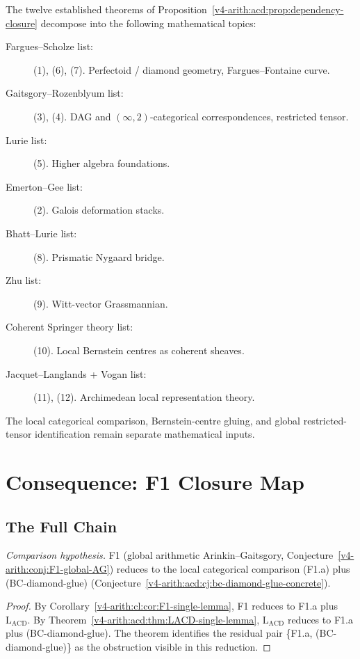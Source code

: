\begin{remark}
\label{v4-arith:acd:rem:source-disjoint-decomposition}
The twelve established theorems of
Proposition~\ref{v4-arith:acd:prop:dependency-closure} decompose into the
following mathematical topics:
\begin{description}
\item[Fargues--Scholze list:] (1), (6), (7). Perfectoid / diamond
geometry, Fargues--Fontaine curve.
\item[Gaitsgory--Rozenblyum list:] (3), (4). DAG and
\((\infty,2)\)-categorical correspondences, restricted tensor.
\item[Lurie list:] (5). Higher algebra foundations.
\item[Emerton--Gee list:] (2). Galois deformation stacks.
\item[Bhatt--Lurie list:] (8). Prismatic Nygaard bridge.
\item[Zhu list:] (9). Witt-vector Grassmannian.
\item[Coherent Springer theory list:] (10). Local Bernstein
centres as coherent sheaves.
\item[Jacquet--Langlands + Vogan list:] (11), (12). Archimedean
local representation theory.
\end{description}
The local categorical comparison, Bernstein-centre gluing, and global
restricted-tensor identification remain separate mathematical inputs.
\end{remark}

\section{Consequence: F1 Closure Map}
\label{v4-arith:acd:F1-closure-map}

\subsection{The Full Chain}

\begin{theorem}
\label{v4-arith:acd:thm:F1-closure}
\emph{Comparison hypothesis.} F1 (global arithmetic
Arinkin--Gaitsgory, Conjecture~\ref{v4-arith:conj:F1-global-AG}) reduces to
the local categorical comparison (F1.a) plus
(BC-diamond-glue) (Conjecture~\ref{v4-arith:acd:cj:bc-diamond-glue-concrete}).
\end{theorem}

\begin{proof}
By Corollary~\ref{v4-arith:cl:cor:F1-single-lemma}, F1 reduces to F1.a plus
\(\mathrm{L}_{\mathrm{ACD}}\). By
Theorem~\ref{v4-arith:acd:thm:LACD-single-lemma},
\(\mathrm{L}_{\mathrm{ACD}}\) reduces to F1.a plus (BC-diamond-glue).
The theorem identifies the residual pair \{F1.a, (BC-diamond-glue)\}
as the obstruction visible in this reduction.
\end{proof}

